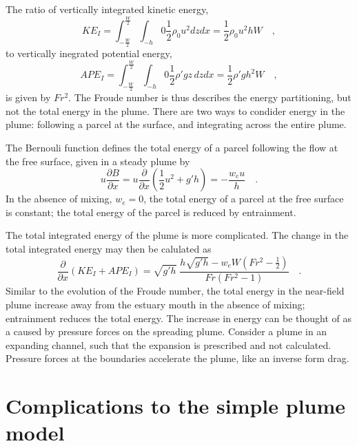 \documentclass[12pt]{article}
\begin{document}
The ratio of vertically integrated kinetic energy, 
\begin{equation}
    KE_I = \int_{-\frac{W}{2}}^{\frac{W}{2}} \int_{-h}{0} \frac{1}{2} \rho_0 u^2 dz dx = \frac{1}{2} \rho_0 u^2 h W \quad ,
\end{equation} 
to vertically inegrated potential energy, 
\begin{equation}
    APE_I = \int_{-\frac{W}{2}}^{\frac{W}{2}} \int_{-h}{0} \frac{1}{2} \rho' g z\, dz dx = \frac{1}{2} \rho' g h^2 W \quad ,
\end{equation}
is given by $Fr^2$. The Froude number is thus describes the energy partitioning, but not the total energy in the plume. There are two ways to condider energy in the plume: following a parcel at the surface, and integrating across the entire plume. 

The Bernouli function defines the total energy of a parcel following the flow at the free surface, given in a steady plume by
\begin{equation}
    u \frac{\partial B}{\partial x} = u \frac{\partial }{\partial x}\left( \frac{1}{2} u^2 + g' h\right) = -\frac{w_e u}{h} \quad .
\end{equation}
In the absence of mixing, $w_e = 0$, the total energy of a parcel at the free surface is constant; the total energy of the parcel is reduced by entrainment. 

The total integrated energy of the plume is more complicated. The change in the total integrated energy may then be calulated as
\begin{equation}
    \frac{\partial}{\partial x} \left( KE_I + APE_I \right) = \sqrt{g' h}\; \frac{h \sqrt{g' h} - w_e W (Fr^2 - \frac{1}{2})}{Fr(Fr^2 - 1)} \quad .
\end{equation}
Similar to the evolution of the Froude number, the total energy in the near-field plume increase away from the estuary mouth in the absence of mixing; entrainment reduces the total energy. The increase in energy can be thought of as a caused by pressure forces on the spreading plume. Consider a plume in an expanding channel, such that the expansion is prescribed and not calculated. Pressure forces at the boundaries accelerate the plume, like an inverse form drag. 



\section{Complications to the simple plume model}
\end{document}
